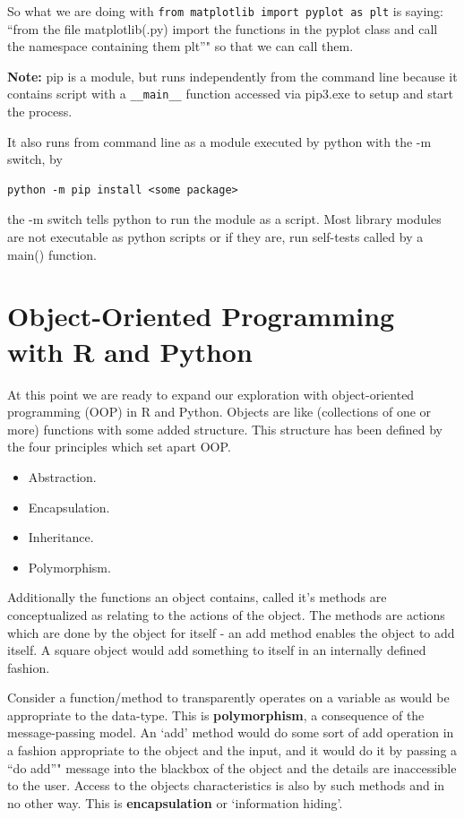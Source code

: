 \documentclass[]{book}
\providecommand{\tightlist}{%
  \setlength{\itemsep}{0pt}\setlength{\parskip}{0pt}}
\theoremstyle{definition}
\theoremstyle{definition}
\theoremstyle{definition}
\theoremstyle{remark}
\begin{document}
So what we are doing with
\texttt{from\ matplotlib\ import\ pyplot\ as\ plt} is saying: ``from the
file matplotlib(.py) import the functions in the pyplot class and call
the namespace containing them plt''" so that we can call them.

\textbf{Note:} pip is a module, but runs independently from the command
line because it contains script with a \texttt{\_\_main\_\_} function
accessed via pip3.exe to setup and start the process.

It also runs from command line as a module executed by python with the
-m switch, by

\begin{verbatim}
python -m pip install <some package>
\end{verbatim}

the -m switch tells python to run the module as a script. Most library
modules are not executable as python scripts or if they are, run
self-tests called by a main() function.

\chapter{Object-Oriented Programming with R and
Python}\label{object-oriented-programming-with-r-and-python}

At this point we are ready to expand our exploration with
object-oriented programming (OOP) in R and Python. Objects are like
(collections of one or more) functions with some added structure. This
structure has been defined by the four principles which set apart OOP.

\begin{itemize}
\tightlist
\item
  Abstraction.
\item
  Encapsulation.
\item
  Inheritance.
\item
  Polymorphism.
\end{itemize}

Additionally the functions an object contains, called it's methods are
conceptualized as relating to the actions of the object. The methods are
actions which are done by the object for itself - an add method enables
the object to add itself. A square object would add something to itself
in an internally defined fashion.

Consider a function/method to transparently operates on a variable as
would be appropriate to the data-type. This is \textbf{polymorphism}, a
consequence of the message-passing model. An `add' method would do some
sort of add operation in a fashion appropriate to the object and the
input, and it would do it by passing a ``do add''" message into the
blackbox of the object and the details are inaccessible to the user.
Access to the objects characteristics is also by such methods and in no
other way. This is \textbf{encapsulation} or `information hiding'.
\end{document}
